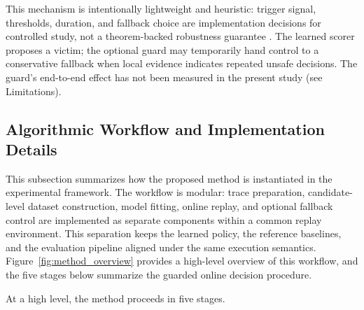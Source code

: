 \documentclass[preprint,12pt]{elsarticle}
\begin{document}
This mechanism is intentionally lightweight and heuristic: trigger signal, thresholds, duration, and fallback choice are implementation decisions for controlled study, not a theorem-backed robustness guarantee \cite{wei2020better_simpler_lac,chledowski2021robust_lac_experimental}. The learned scorer proposes a victim; the optional guard may temporarily hand control to a conservative fallback when local evidence indicates repeated unsafe decisions. The guard's end-to-end effect has not been measured in the present study (see Limitations).

\subsection{Algorithmic Workflow and Implementation Details}
\label{subsec:workflow_implementation}

This subsection summarizes how the proposed method is instantiated in the experimental framework. The workflow is modular: trace preparation, candidate-level dataset construction, model fitting, online replay, and optional fallback control are implemented as separate components within a common replay environment. This separation keeps the learned policy, the reference baselines, and the evaluation pipeline aligned under the same execution semantics. Figure~\ref{fig:method_overview} provides a high-level overview of this workflow, and the five stages below summarize the guarded online decision procedure.

At a high level, the method proceeds in five stages.
\end{document}
